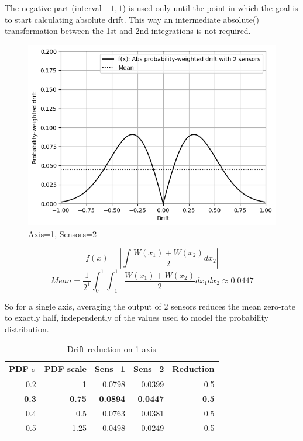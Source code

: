 \documentclass[10pt, twocolumn, a4paper]{article}
\begin{document}
            The negative part (interval $-1,1$) is used only until the point in which the goal is to start calculating absolute drift. This way an intermediate absolute() transformation between the 1st and 2nd integrations is not required.
            \begin{figure}[H]
                \begin{center}
                    \caption{Axis=1, Sensors=2}
                    \label{fig_zero_12}
                    \includegraphics[width=0.8\linewidth]{multiple_ars/figure_drift_2.png}
                \end{center}
            \end{figure}
            \vspace{-8mm}
            $$ f(x) = \left| \int \frac{ W(x_1) + W(x_2) }{2} dx_2 \right| $$
            $$ Mean = \frac{1}{2^1} \int_0^1 \int_{-1}^1 \frac{ W(x_1) + W(x_2) }{2} dx_1 dx_2  \approx 0.0447 $$

            So for a single axis, averaging the output of 2 sensors reduces the mean zero-rate to exactly half, independently of the values used to model the probability distribution.
            \begin{table}[H]
                \caption{Drift reduction on 1 axis}
                \vspace{2mm}
                \begin{tabular}{|r|r|r|r|r|}
                    \hline
                        PDF $\sigma$ & PDF scale & Sens=1 & Sens=2 & Reduction \\
                    \hline
                        0.2 &    1 & 0.0798 & 0.0399 & 0.5 \\
                        \textbf{0.3} & \textbf{0.75} & \textbf{0.0894} & \textbf{0.0447} & \textbf{0.5} \\
                        0.4 &  0.5 & 0.0763 & 0.0381 & 0.5 \\
                        0.5 & 1.25 & 0.0498 & 0.0249 & 0.5 \\
                    \hline
                \end{tabular}
            \end{table}
\end{document}
